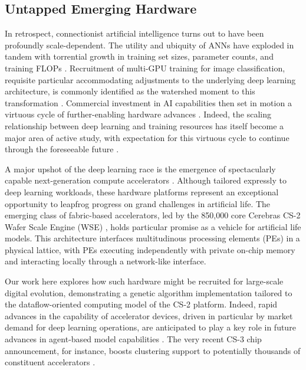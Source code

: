 \subsection{Untapped Emerging Hardware}

In retrospect, connectionist artificial intelligence turns out to have been profoundly scale-dependent.
The utility and ubiquity of ANNs have exploded in tandem with torrential growth in training set sizes, parameter counts, and training FLOPs \citep{marcus2018deep}.
Recruitment of multi-GPU training for image classification, requisite particular accommodating adjustments to the underlying deep learning architecture, is commonly identified as the watershed moment to this transformation
 \citep{krizhevsky2012imagenet}.
Commercial investment in AI capabilities then set in motion a virtuous cycle of further-enabling hardware advances \citep{jouppi2017datacenter}.
Indeed, the scaling relationship between deep learning and training resources has itself become a major area of active study, with expectation for this virtuous cycle to continue through the foreseeable future \citep{kaplan2020scaling}.

A major upshot of the deep learning race is the emergence of spectacularly capable next-generation compute accelerators \citep{zhang2016cambricon,emani2021accelerating,jia2019dissecting,medina2020habana}.
Although tailored expressly to deep learning workloads, these hardware platforms represent an exceptional opportunity to leapfrog progress on grand challenges in artificial life.
The emerging class of fabric-based accelerators, led by the 850,000 core Cerebras CS-2 Wafer Scale Engine (WSE) \citep{lauterbach2021path,lie2022cerebras}, holds particular promise as a vehicle for artificial life models.
This architecture interfaces multitudinous processing elements (PEs) in a physical lattice, with PEs executing independently with private on-chip memory and interacting locally through a network-like interface.

Our work here explores how such hardware might be recruited for large-scale digital evolution, demonstrating a genetic algorithm implementation tailored to the dataflow-oriented computing model of the CS-2 platform.
Indeed, rapid advances in the capability of accelerator devices, driven in particular by market demand for deep learning operations, are anticipated to play a key role in future advances in agent-based model capabilities \citep{perumalla2022computer}.
The very recent CS-3 chip announcement, for instance, boosts clustering support to potentially thousands of constituent accelerators \citep{moore2024cerebras}.



